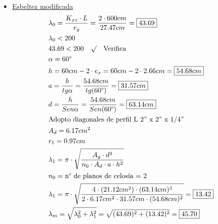 \begin{itemize}
\item \underline{Esbeltez modificada}
\begin{align*}
& \lambda_0 = \frac{K_{xz} \cdot L}{r_y} = \frac{2 \cdot 600cm}{27.47cm} = \framebox{$43.69$}\\
& \lambda_0 < 200 \\
& 43.69 < 200 \quad \surd \quad \text{Verifica} \\
& \alpha = 60\text{°}\\
& h = 60cm - 2 \cdot e_x = 60cm - 2 \cdot 2.66cm = \framebox{$54.68cm$} \\
& a = \frac{h}{tg \alpha} = \frac{54.68cm}{tg(60\text{°})} = \framebox{$31.57cm$}\\
& d = \frac{h}{Sen\alpha} = \frac{54.68cm}{Sen(60\text{°})} = \framebox{$63.14cm$}\\
& \text{Adopto diagonales de perfil L 2” x 2” x 1/4”} \\
& A_d = 6.17cm^2 \\
& r_1 = 0.97cm \\
& \lambda_1 = \pi \cdot \sqrt{\frac{A_g \cdot d^3}{n_0 \cdot A_d \cdot a \cdot h^2}} \\
& n_0 = \text{n° de planos de celosía = 2} \\
& \lambda_1 = \pi \cdot \sqrt{\frac{4 \cdot (21.12cm^2) \cdot (63.14cm)^3}{2 \cdot 6.17cm^2 \cdot 31.57cm \cdot (54.68cm)^2}} = \framebox{$13.42$}\\
& \lambda_m = \sqrt{\lambda_0^2 + \lambda_1^2} = \sqrt{(43.69)^2 + (13.42)^2} = \framebox{$45.70$}
\end{align*}


\end{itemize}
